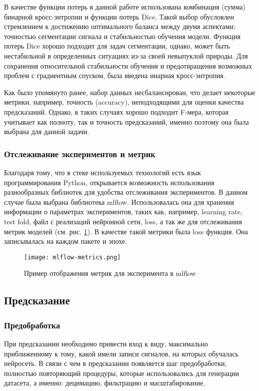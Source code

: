 В качестве функции потерь в данной работе использована комбинация (сумма) бинарной
кросс-энтропии и функции потерь Dice. Такой выбор обусловлен стремлением к
достижению оптимального баланса между двумя аспектами: точностью сегментации
сигнала и стабильностью обучения модели. Функция потерь Dice хорошо подходит
для задач сегментации, однако, может быть нестабильной в определенных ситуациях
из-за своей невыпуклой природы. Для сохранения относительной стабильности
обучения и предотвращения возможных проблем с градиентным спуском, была введена
инарная кросс-энтропия.

Как было упомянуто ранее, набор данных несбалансирован, что делает некоторые
метрики, например, точность (accuracy), неподходящими для оценки качества
предсказаний. Однако, в таких случаях хорошо подходит F-мера, которая
учитывает как полноту, так и точность предсказаний, именно поэтому она была
выбрана для данной задачи.

\subsubsection{Отслеживание экспериментов и метрик}

Благодаря тому, что в стеке используемых технологий есть язык программирования
Python, открывается возможность использования разнообразных библиотек для
удобства отслеживания экспериментов. В данном случае была выбрана библиотека
mlflow. Использовалась она для хранения информации о параметрах экспериментов,
таких как, например, learning rate, test fold, файл с реализаций нейронной
сети, loss, а так же для отслеживания метрик моделей (см. рис.
\ref{fig:mlflow-metrics}). В качестве такой метрики была loss функция. Она
записывалась на каждом пакете и эпохе.

\begin{figure}[!htb]
	\centering
	\caption{Пример отображения метрик для эксперимента в mlflow}
	\texttt{[image: mlflow-metrics.png]}
	\label{fig:mlflow-metrics}
\end{figure}

\subsection{Предсказание}
\subsubsection{Предобработка}

При предсказании необходимо привести вход к виду, максимально приближенному к
тому, какой имели записи сигналов, на которых обучалась нейросеть. В связи с
чем в предсказании появляется шаг предобработки, полностью повторяющий
процедуры, которые использовались для генерации датасета, а именно: децимацию,
фильтрацию и масштабирование.

